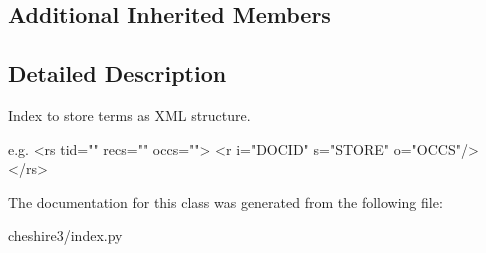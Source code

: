 \subsection*{Additional Inherited Members}


\subsection{Detailed Description}
\begin{DoxyVerb}Index to store terms as XML structure.

e.g.
<rs tid="" recs="" occs="">
  <r i="DOCID" s="STORE" o="OCCS"/>
</rs>
\end{DoxyVerb}
 

The documentation for this class was generated from the following file\-:\begin{DoxyCompactItemize}
\item 
cheshire3/index.\-py\end{DoxyCompactItemize}
